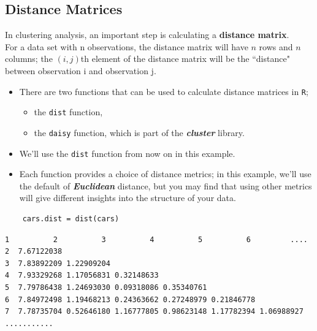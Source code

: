 \documentclass[12pt]{article}
\begin{document}
\subsection{Distance Matrices}
In clustering analysis, an important step is calculating a \textbf{distance matrix}. \\ For a data set with n observations, the distance matrix will have $n$ rows and $n$ columns; the $(i,j)$th element of the distance matrix will be the ``distance" between observation i and observation j.
\begin{itemize}
	\item There are two functions that can be used to calculate distance matrices in \texttt{R}; 
	\begin{itemize}
		\item the \texttt{dist} function, 
		\item  the \texttt{daisy} function, which is part of the \textbf{\textit{cluster}} library. 
	\end{itemize}
	\item We'll use the \texttt{dist} function from now on in this example.
	\item Each function provides a choice of distance metrics; in this example, we'll use the default of \textbf{\textit{Euclidean}} distance, but you may find that using other metrics will give different insights into the structure of your data.
\end{itemize} 
\newpage
\begin{framed}
	\begin{verbatim}
	cars.dist = dist(cars)
	\end{verbatim}
\end{framed}

\begin{verbatim}
1          2          3          4          5          6         ....         
2  7.67122038                                                                                        
3  7.83892209 1.22909204                                                                             
4  7.93329268 1.17056831 0.32148633                                                                  
5  7.79786438 1.24693030 0.09318086 0.35340761                                                       
6  7.84972498 1.19468213 0.24363662 0.27248979 0.21846778                                            
7  7.78735704 0.52646180 1.16777805 0.98623148 1.17782394 1.06988927
...........
\end{verbatim}
\end{document}
